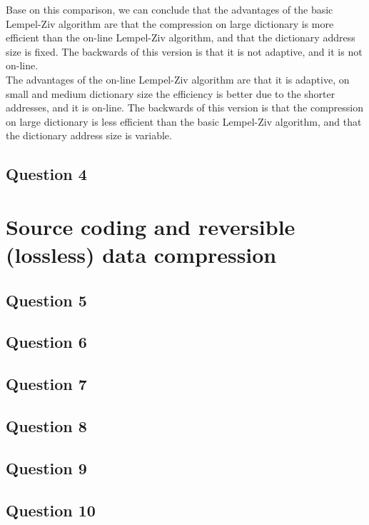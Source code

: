 \documentclass[]{template}
\begin{document}
    \noindent
    Base on this comparison, we can conclude that the advantages of the basic Lempel-Ziv algorithm are that the compression on large dictionary is 
    more efficient than the on-line Lempel-Ziv algorithm, and that the dictionary address size is fixed. 
    The backwards of this version is that it is not adaptive, and it is not on-line.\\

    \noindent
    The advantages of the on-line Lempel-Ziv algorithm are that it is adaptive, on small and medium dictionary size the efficiency is better due to the shorter addresses, and it is on-line. The backwards of this version is that the compression
    on large dictionary is less efficient than the basic Lempel-Ziv algorithm, and that the dictionary address size is variable.\\

    \subsection{Question 4}

\section{Source coding and reversible (lossless) data compression}

    \subsection{Question 5}

    \subsection{Question 6}

    \subsection{Question 7}

    \subsection{Question 8}

    \subsection{Question 9}

    \subsection{Question 10}
\end{document}
